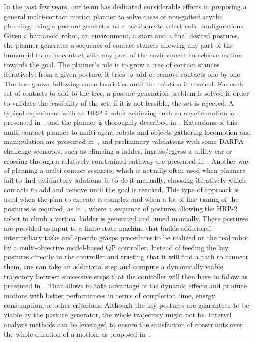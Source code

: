 In the past few years, our team has dedicated considerable efforts in proposing a general multi-contact motion planner to solve cases of non-gaited acyclic planning, using a posture generator as a backbone to select valid configurations.
Given a humanoid robot, an environment, a start and a final desired postures, the planner generates a sequence of contact stances allowing any part of the humanoid to make contact with any part of the environment to achieve motion towards the goal.
The planner's role is to grow a tree of contact stances iteratively; from a given posture, it tries to add or remove contacts one by one.
The tree grows, following some heuristics until the solution is reached.
For each set of contacts to add to the tree, a posture generation problem is solved in order to validate the feasibility of the set, if it is not feasible, the set is rejected.
A typical experiment with an HRP-2 robot achieving such an acyclic motion is presented in~\cite{escande:iser:2008}, and the planner is thoroughly described in~\cite{escande:ras:2013}.
Extensions of this multi-contact planner to multi-agent robots and objects gathering locomotion and manipulation are presented in~\cite{bouyarmane:ar:2012}, and preliminary validations with some DARPA challenge scenarios, such as climbing a ladder, ingress/egress a utility car or crossing through a relatively constrained pathway are presented in~\cite{bouyarmane:humanoids:2012}.
Another way of planning a multi-contact scenario, which is actually often used when planners fail to find satisfactory solutions, is to do it manually, choosing iteratively which contacts to add and remove until the goal is reached.
This type of approach is used when the plan to execute is complex and when a lot of fine tuning of the postures is required, as in~\cite{vaillant:autonomousrobots:2016}, where a sequence of postures allowing the HRP-2 robot to climb a vertical ladder is generated and tuned manually.
Those postures are provided as input to a finite state machine that builds additional intermediary tasks and specific grasps procedures to be realized on the real robot by a multi-objective model-based QP controller.
Instead of feeding the key postures directly to the controller and trusting that it will find a path to connect them, one can take an additional step and compute a dynamically viable trajectory between successive steps that the controller will then have to follow as presented in~\cite{lengagne2013generation}.
That allows to take advantage of the dynamic effects and produce motions with better performances in terms of completion time, energy consumption, or other criterions.
Although the key postures are guaranteed to be viable by the posture generator, the whole trajectory might not be.
Interval analysis methods can be leveraged to ensure the satisfaction of constraints over the whole duration of a motion, as proposed in~\cite{lengagne2011planning}.

